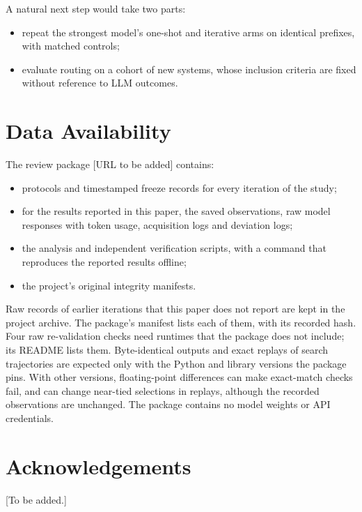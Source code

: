 A natural next step would take two parts:
\begin{itemize}
  \item repeat the strongest model's one-shot and iterative arms on identical prefixes, with matched controls;
  \item evaluate routing on a cohort of new systems, whose inclusion criteria are fixed without reference to LLM outcomes.
\end{itemize}

\section*{Data Availability}

The review package [URL to be added] contains:
\begin{itemize}
  \item protocols and timestamped freeze records for every iteration of the study;
  \item for the results reported in this paper, the saved observations, raw model responses with token usage, acquisition logs and deviation logs;
  \item the analysis and independent verification scripts, with a command that reproduces the reported results offline;
  \item the project's original integrity manifests.
\end{itemize}
Raw records of earlier iterations that this paper does not report are kept in the project archive. The package's manifest lists each of them, with its recorded hash. Four raw re-validation checks need runtimes that the package does not include; its README lists them. Byte-identical outputs and exact replays of search trajectories are expected only with the Python and library versions the package pins. With other versions, floating-point differences can make exact-match checks fail, and can change near-tied selections in replays, although the recorded observations are unchanged. The package contains no model weights or API credentials.

\section*{Acknowledgements}

[To be added.]





